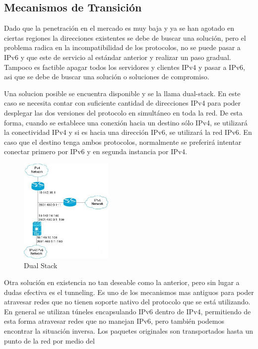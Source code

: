 \documentclass[11pt,a4paper]{article}
\begin{document}
\subsection{Mecanismos de Transición}
Dado que la penetración en el mercado es muy baja y ya se han agotado en ciertas regiones la 
direcciones existentes se debe de buscar una solución, pero el problema radica en la 
incompatibilidad de los protocolos, no se puede pasar a IPv6 y que este de servicio al estándar 
anterior y realizar un paso gradual. Tampoco es factible apagar todos los servidores y clientes IPv4 
y pasar a IPv6, asi que se debe de buscar una solución o soluciones de compromiso.\par
Una solucion posible se encuentra disponible y se la llama dual-stack.
En este caso se necesita contar con suficiente cantidad de direcciones IPv4 para poder desplegar las 
dos versiones del protocolo en simultáneo en toda la red. De esta forma, cuando se establece una 
conexión hacia un destino sólo IPv4, se utilizará la conectividad IPv4 y si es hacia una dirección 
IPv6, se utilizará la red IPv6. En caso que el destino tenga ambos protocolos, normalmente se 
preferirá intentar conectar primero por IPv6 y en segunda instancia por IPv4.
\begin{figure}[h!]
 \centering
 \includegraphics[width=0.4\textwidth]{dual_stack.jpg}
 \caption[Dual Stack]{Dual Stack}
\end{figure}\par
Otra solución en existencia no tan deseable como la anterior, pero sin lugar a dudas efectiva es el 
tunneling.
Es uno de los mecanismos mas antiguos para poder atravesar redes que no tienen soporte nativo del 
protocolo que se está utilizando. En general se utilizan túneles encapsulando IPv6 dentro de IPv4, 
permitiendo de esta forma atravesar redes que no manejan IPv6, pero también podemos encontrar la 
situación inversa. Los paquetes originales son transportados hasta un punto de la red por medio del 
\end{document}
